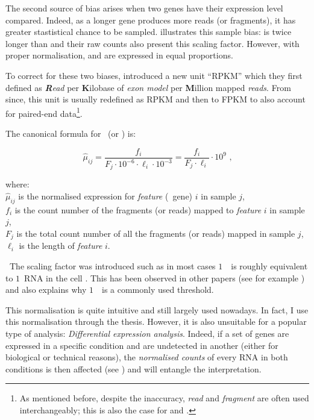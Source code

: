 The second source of bias arises when two genes have their expression level
compared. Indeed, as a longer gene produces more reads (or fragments), it has
greater stastistical chance to be sampled.  illustrates
this sample bias:  is twice longer than  and their
raw counts also present this scaling factor. However, with proper normalisation,
 and  are expressed in equal proportions.

To correct for these two biases, \cite{Mortazavi2008} introduced a new unit
\enquote{RPKM} which they first defined as \emph{\textbf{R}ead} per
\textbf{K}ilobase of \emph{exon model} per \textbf{M}illion mapped \emph{reads}.
From since, this unit is usually redefined as \acrlong{RPKM} and then to
\acrfull{FPKM} to also account for paired-end data\footnote{As mentioned before,
despite the inaccuracy, \emph{read} and \emph{fragment} are often used
interchangeably; this is also the case for \emph{\RPKM} and \emph{\FPKM}.}.

The canonical formula for \FPKM\ (or \RPKM) is:

\begin{equation}
\hat{\mu}_{ij}=\frac{f_i}{F_j\cdot10^{-6} \cdot \ell_i\cdot10^{-3}}
              =\frac{f_i}{F_j\cdot\ell_i}\cdot10^{9} \text{\ ,}
\end{equation}

where: \\{\small
$\hat{\mu}_{ij}$ is the normalised expression for \emph{feature} (\eg\ gene) $i$
in sample $j$,\\
$f_i$ is the count number of the fragments (or reads) mapped to
\emph{feature} $i$ in sample $j$,\\
$F_j$ is the total count number of all the fragments (or reads) mapped in
sample $j$,\\
$\ell_i$ is the length of \emph{feature} $i$.
}

\NB\ The scaling factor was introduced such as in most cases $1$\ \FPKM\ is
roughly equivalent to $1$\ \gls{RNA} in the cell . This
has been observed in other papers (see for example \cite{Hebenstreit:2011}) and
also explains why $1$\ \FPKM\ is a commonly used threshold.

This normalisation is quite intuitive and still largely used nowadays. In fact,
I use this normalisation through the thesis. However, it is also unsuitable for
a popular type of analysis: \emph{Differential expression analysis}. Indeed,
if a set of genes are expressed in a specific condition and are undetected in
another (either for biological or technical reasons), the \emph{normalised counts}
of every \gls{RNA} in both conditions is then affected (see )
and will entangle the interpretation.


